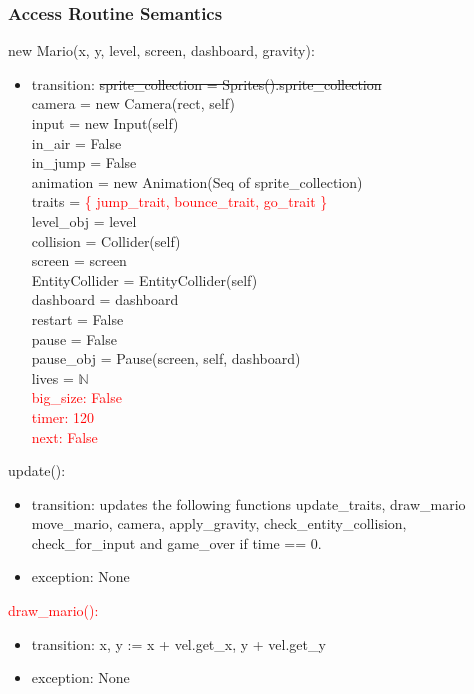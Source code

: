 \documentclass[12pt]{article}
\begin{document}
\subsubsection*{Access Routine Semantics}
new Mario(x, y, level, screen, dashboard, gravity):
\begin{itemize}
    \item transition: \st{sprite\_collection = Sprites().sprite\_collection}\\
camera = new Camera(rect, self)\\
input = new Input(self)\\
in\_air = False\\
in\_jump = False\\
animation = new Animation(Seq of sprite\_collection)\\
traits = \textcolor{red}{\{ jump\_trait, bounce\_trait, go\_trait \}}\\
level\_obj = level\\
collision = Collider(self)\\
screen = screen\\
EntityCollider = EntityCollider(self)\\
dashboard = dashboard\\
restart = False\\
pause = False\\
pause\_obj = Pause(screen, self, dashboard)\\
lives = $\mathbb{N}$\\
\textcolor{red}{big\_size: False}\\
\textcolor{red}{timer: 120}\\
\textcolor{red}{next: False}\\\textbf{}
\end{itemize}

update():
\begin{itemize}
    \item transition: updates the following functions update\_traits, draw\_mario move\_mario, camera, apply\_gravity, check\_entity\_collision, check\_for\_input and game\_over if time == 0.
    \item exception: None
\end{itemize}

\textcolor{red}{draw\_mario():}
\begin{itemize}
    \item transition: x, y := x + vel.get\_x, y + vel.get\_y
    \item exception: None
\end{itemize}
\end{document}
